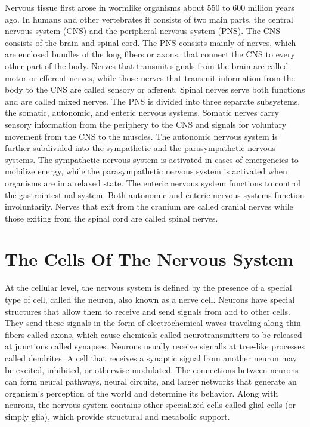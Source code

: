\documentclass[]{book}
\begin{document}
Nervous tissue first arose in wormlike organisms about 550 to 600 million years ago. In humans and other vertebrates it consists of two main parts, the central nervous system (CNS) and the peripheral nervous system (PNS). The CNS consists of the brain and spinal cord. The PNS consists mainly of nerves, which are enclosed bundles of the long fibers or axons, that connect the CNS to every other part of the body. Nerves that transmit signals from the brain are called motor or efferent nerves, while those nerves that transmit information from the body to the CNS are called sensory or afferent. Spinal nerves serve both functions and are called mixed nerves. The PNS is divided into three separate subsystems, the somatic, autonomic, and enteric nervous systems. Somatic nerves carry sensory information from the periphery to the CNS and signals for voluntary movement from the CNS to the muscles. The autonomic nervous system is further subdivided into the sympathetic and the parasympathetic nervous systems. The sympathetic nervous system is activated in cases of emergencies to mobilize energy, while the parasympathetic nervous system is activated when organisms are in a relaxed state. The enteric nervous system functions to control the gastrointestinal system. Both autonomic and enteric nervous systems function involuntarily. Nerves that exit from the cranium are called cranial nerves while those exiting from the spinal cord are called spinal nerves.

\hypertarget{the-cells-of-the-nervous-system}{%
\section{The Cells Of The Nervous System}\label{the-cells-of-the-nervous-system}}

At the cellular level, the nervous system is defined by the presence of a special type of cell, called the neuron, also known as a nerve cell. Neurons have special structures that allow them to receive and send signals from and to other cells. They send these signals in the form of electrochemical waves traveling along thin fibers called axons, which cause chemicals called neurotransmitters to be released at junctions called synapses. Neurons usually receive signalls at tree-like processes called dendrites. A cell that receives a synaptic signal from another neuron may be excited, inhibited, or otherwise modulated. The connections between neurons can form neural pathways, neural circuits, and larger networks that generate an organism's perception of the world and determine its behavior. Along with neurons, the nervous system contains other specialized cells called glial cells (or simply glia), which provide structural and metabolic support.
\end{document}
